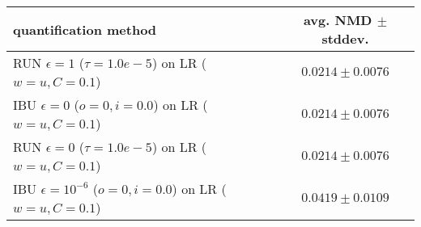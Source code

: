 \begin{tabular}{lc}
  \toprule
  quantification method & avg. NMD $\pm$ stddev. \\
  \midrule
  RUN $\epsilon=1$ ($\tau=1.0e-5$) on LR ($w=u, C=0.1$) & $\mathbf{0.0214 \pm 0.0076}$ \\
  IBU $\epsilon=0$ ($o=0, i=0.0$) on LR ($w=u, C=0.1$) & $0.0214 \pm 0.0076$ \\
  RUN $\epsilon=0$ ($\tau=1.0e-5$) on LR ($w=u, C=0.1$) & $0.0214 \pm 0.0076$ \\
  IBU $\epsilon=10^{-6}$ ($o=0, i=0.0$) on LR ($w=u, C=0.1$) & $0.0419 \pm 0.0109$ \\
  \bottomrule
\end{tabular}
